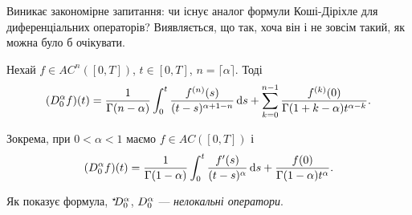 

Виникає закономірне запитання: чи існує аналог формули Коші-Діріхле для диференціальних операторів? Виявляється, що так, хоча він і не зовсім такий, як можна було б очікувати.

\begin{theorem}
    Нехай $f \in AC^n([0, T])$, $t \in [0, T]$, $n = \lceil \alpha \rceil$. Тоді
    \begin{equation}
        (D_0^{\alpha} f) (t) = \frac{1}{\Gamma(n - \alpha)} \int_0^t \frac{f^{(n)}(s)}{(t - s)^{\alpha + 1 - n}} \mathop{}\!\mathrm{d} s + \sum_{k = 0}^{n - 1} \frac{f^{(k)}(0)}{\Gamma(1 + k - \alpha) t^{\alpha - k}}.
    \end{equation}
\end{theorem}

\begin{example}
    Зокрема, при $0 < \alpha < 1$ маємо $f \in AC([0, T])$ і
    \begin{equation}
        (D_0^{\alpha} f) (t) = \frac{1}{\Gamma(1 - \alpha)} \int_0^t \frac{f'(s)}{(t - s)^\alpha} \mathop{}\!\mathrm{d} s + \frac{f(0)}{\Gamma(1 - \alpha) t^\alpha}.
    \end{equation}
\end{example}

\begin{remark}
    Як показує формула, ${}^{\star\!\!}D_0^{\alpha}$, $D_0^{\alpha}$ --- \textit{нелокальні оператори}.
\end{remark}

